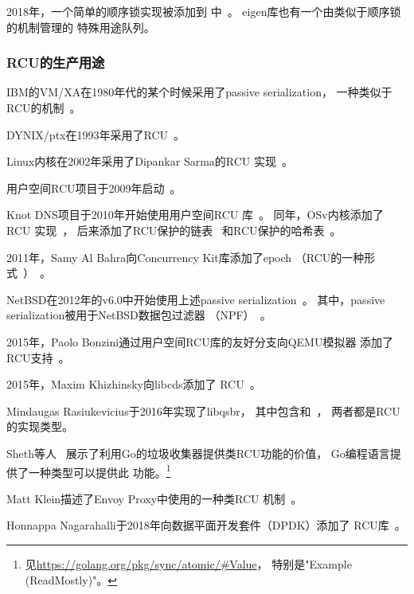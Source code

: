 2018年，一个简单的顺序锁实现被添加到
中~\cite{DavidGoldblatt2018seqlock}。
eigen库也有一个由类似于顺序锁的机制管理的
特殊用途队列。

\subsubsection{RCU的生产用途}
\label{sec:defer:Production Uses of RCU}

IBM的VM/XA在1980年代的某个时候采用了passive serialization，
一种类似于RCU的机制~\cite{Hennessy89}。

DYNIX/ptx在1993年采用了RCU~\cite{McKenney98,Slingwine95}。

Linux内核在2002年采用了Dipankar Sarma的RCU
实现~\cite{Torvalds2.5.43}。

用户空间RCU项目于2009年启动~\cite{MathieuDesnoyers2009URCU}。

Knot DNS项目于2010年开始使用用户空间RCU
库~\cite{LubosSlovak2010KnotDNSRCU}。
同年，OSv内核添加了RCU
实现~\cite{AviKivity2013OSvRCU}，
后来添加了RCU保护的链表~\cite{AviKivity2013OSvRCUlist}
和RCU保护的哈希表~\cite{AviKivity2013OSvRCUhash}。

2011年，Samy Al Bahra向Concurrency Kit库添加了epoch
（RCU的一种形式~\cite{UCAM-CL-TR-579,KeirFraser2007withoutLocks}）~\cite{SamyAlBahra2011ckEpoch}。

NetBSD在2012年的v6.0中开始使用上述passive
serialization~\cite{NetBSD2012pserialize}。
其中，passive serialization被用于NetBSD数据包过滤器
（NPF）~\cite{MindaugasRasiukevicius2014NPFRCU}。

2015年，Paolo Bonzini通过用户空间RCU库的友好分支向QEMU模拟器
添加了RCU支持~\cite{MikeDay2013RCUqemu,PaoloBonzini2013QEMURCU}。

2015年，Maxim Khizhinsky向libcds添加了
RCU~\cite{MaxKhiszinsky2015C++RCU}。

Mindaugas Rasiukevicius于2016年实现了libqsbr，
其中包含和~\cite{MindaugasRasiukevicius2016libqsbr}，
两者都是RCU的实现类型。

Sheth等人~\cite{HarshalSheth2016goRCU}
展示了利用Go的垃圾收集器提供类RCU功能的价值，
Go编程语言提供了一种类型可以提供此
功能。\footnote{
	见\url{https://golang.org/pkg/sync/atomic/\#Value}，
	特别是"Example (ReadMostly)"。}

Matt Klein描述了Envoy Proxy中使用的一种类RCU
机制~\cite{MattKlein2017EnvoyRCU}。

Honnappa Nagarahalli于2018年向数据平面开发套件（DPDK）添加了
RCU库~\cite{HonnappaNagarahalli2018dpdkRCU}。

